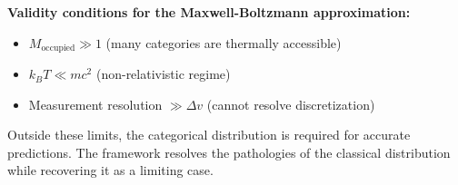 \textbf{Validity conditions for the Maxwell-Boltzmann approximation:}
\begin{itemize}
\item $M_{\text{occupied}} \gg 1$ (many categories are thermally accessible)
\item $k_B T \ll mc^2$ (non-relativistic regime)
\item Measurement resolution $\gg \Delta v$ (cannot resolve discretization)
\end{itemize}

Outside these limits, the categorical distribution is required for accurate predictions. The framework resolves the pathologies of the classical distribution while recovering it as a limiting case.
